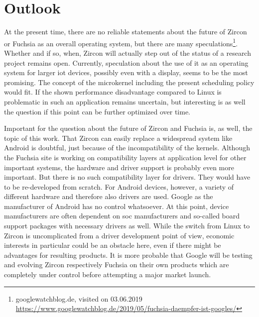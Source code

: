
\chapter{Outlook}\label{ch:outlook}
%

At the present time, there are no reliable statements about the future of Zircon or Fuchsia as an overall operating system, but there are many speculations\footnote{googlewatchblog.de, visited on 03.06.2019 \url{https://www.googlewatchblog.de/2019/05/fuchsia-daempfer-ist-googles/}}.
Whether and if so, when, Zircon will actually step out of the status of a research project remains open.
Currently, speculation about the use of it as an operating system for larger \ac{iot} devices, possibly even with a display, seems to be the most promising.
The concept of the microkernel including the present scheduling policy would fit.
If the shown performance disadvantage compared to Linux is problematic in such an application remains uncertain, but interesting is as well the question if this point can be further optimized over time.

Important for the question about the future of Zircon and Fuchsia is, as well, the topic of this work.
That Zircon can easily replace a widespread system like Android is doubtful, just because of the incompatibility of the kernels.
Although the Fuchsia site is working on compatibility layers at application level for other important systems, the hardware and driver support is probably even more important.
But there is no such compatibility layer for drivers.
They would have to be re-developed from scratch.
For Android devices, however, a variety of different hardware and therefore also drivers are used.
Google as the manufacturer of Android has no control whatsoever.
At this point, device manufacturers are often dependent on \ac{soc} manufacturers and so-called board support packages with necessary drivers as well.
While the switch from Linux to Zircon is uncomplicated from a driver development point of view, economic interests in particular could be an obstacle here, even if there might be advantages for resulting products.
It is more probable that Google will be testing and evolving Zircon respectively Fuchsia on their own products which are completely under control before attempting a major market launch.

